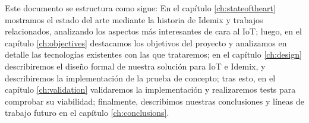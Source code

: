 Este documento se estructura como sigue: En el capítulo \ref{ch:stateoftheart} mostramos el estado del arte mediante la historia de Idemix y trabajos relacionados, analizando los aspectos más interesantes de cara al IoT; luego, en el capítulo \ref{ch:objectives} destacamos los objetivos del proyecto y analizamos en detalle las tecnologías existentes con las que trataremos; en el capítulo \ref{ch:design} describiremos el diseño formal de nuestra solución para IoT e Idemix, y describiremos la implementación de la prueba de concepto; tras esto, en el capítulo \ref{ch:validation} validaremos la implementación y realizaremos tests para comprobar su viabilidad; finalmente, describimos nuestras conclusiones y líneas de trabajo futuro en el capítulo \ref{ch:conclusions}.
